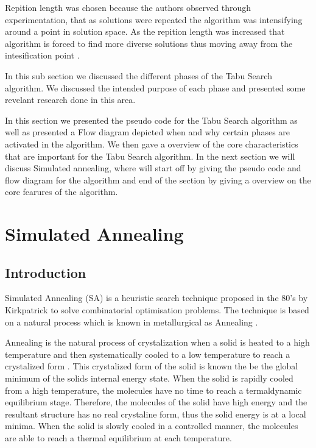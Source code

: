 Repition length was chosen because the authors observed through experimentation, that as solutions were repeated the algorithm was intensifying around a point in solution space. As the repition length was increased that algorithm is forced to find more diverse solutions thus moving away from the intesification point \cite{SelfControllingReactiveTabu}.

In this sub section we discussed the different phases of the Tabu Search algorithm. We discussed the intended purpose of each phase and presented some revelant research done in this area.

In this section we presented the pseudo code for the Tabu Search algorithm as well as presented a Flow diagram depicted when and why certain phases are activated in the algorithm. We then gave a overview of the core characteristics that are important for the Tabu Search algorithm. In the next section we will discuss Simulated annealing, where will start off by giving the pseudo code and flow diagram for the algorithm and end of the section by giving a overview on the core fearures of the algorithm.

\section{Simulated Annealing}
\subsection{Introduction}
Simulated Annealing (SA) is a heuristic search technique proposed in the 80's by Kirkpatrick to solve combinatorial optimisation problems. The technique is based on a natural process which is known in metallurgical as Annealing \cite{SASingleMultiObj,TempCyclingSA}. 

Annealing is the natural process of crystalization when a solid is heated to a high temperature and then systematically cooled to a low temperature to reach a crystalized form \cite{NewSAs,MobileRobotSA}. This crystalized form of the solid is known the be the global minimum of the solids internal energy state. When the solid is rapidly cooled from a high temperature, the molecules have no time to reach a termaldynamic equilibrium stage. Therefore, the molecules of the solid have high energy and the resultant structure has no real crystaline form, thus the solid energy is at a local minima. When the solid is slowly cooled in a controlled manner, the molecules are able to reach a thermal equilibrium at each temperature.

